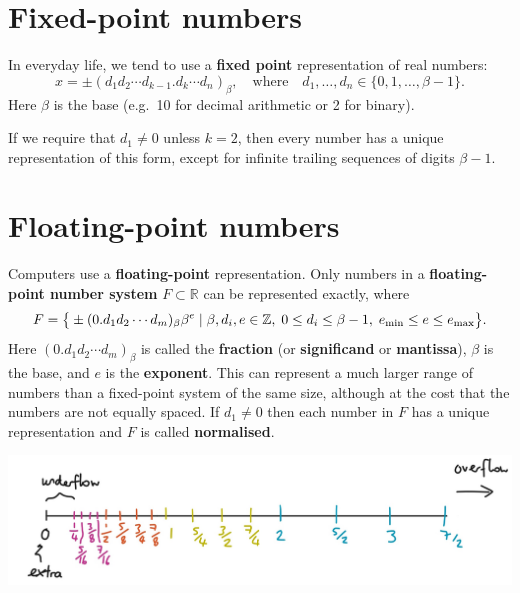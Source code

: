 \documentclass[
  letterpaper,
  DIV=11,
  numbers=noendperiod]{scrreprt}
\begin{document}
\section{Fixed-point numbers}\label{fixed-point-numbers}

In everyday life, we tend to use a \textbf{fixed point} representation
of real numbers: \[
x = \pm (d_1d_2\cdots d_{k-1}.d_k\cdots d_n)_\beta, \quad \textrm{where} \quad d_1,\ldots,d_n\in\{0,1,\ldots,\beta - 1\}.
\] Here \(\beta\) is the base (e.g.~10 for decimal arithmetic or 2 for
binary).

If we require that \(d_1\neq 0\) unless \(k=2\), then every number has a
unique representation of this form, except for infinite trailing
sequences of digits \(\beta - 1\).

\section{Floating-point numbers}\label{floating-point-numbers}

Computers use a \textbf{floating-point} representation. Only numbers in
a \textbf{floating-point number system} \(F\subset\mathbb{R}\) can be
represented exactly, where \[
F = \big\{ \pm (0.d_1d_2\cdots d_{m})_\beta\beta^e \;| \;  \beta, d_i, e \in \mathbb{Z}, \;0 \leq d_i \leq \beta-1, \;e_{\rm min} \leq e \leq e_{\rm max}\big\}.
\] Here \((0.d_1d_2\cdots d_{m})_\beta\) is called the \textbf{fraction}
(or \textbf{significand} or \textbf{mantissa}), \(\beta\) is the base,
and \(e\) is the \textbf{exponent}. This can represent a much larger
range of numbers than a fixed-point system of the same size, although at
the cost that the numbers are not equally spaced. If \(d_1\neq 0\) then
each number in \(F\) has a unique representation and \(F\) is called
\textbf{normalised}.

\begin{center}
\includegraphics[width=0.9\linewidth,height=\textheight,keepaspectratio]{im/fp1.jpg}
\end{center}
\end{document}
